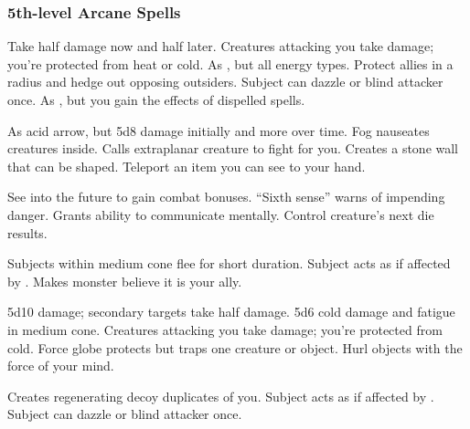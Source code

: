 \subsubsection{5th-level Arcane Spells} 
\begin{swspelllist}
     Take half damage now and half later. 
     Creatures attacking you take damage; you're protected from heat or cold.   As , but all energy types.
     Protect allies in a \areamed radius and hedge out opposing outsiders.
     Subject can dazzle or blind attacker once.
     As , but you gain the effects of dispelled spells.

     As acid arrow, but 5d8 damage initially and more over time.
     Fog nauseates creatures inside.
     Calls extraplanar creature to fight for you.
     Creates a stone wall that can be shaped.
     Teleport an item you can see to your hand.

     See into the future to gain combat bonuses.
     ``Sixth sense'' warns of impending danger.
     Grants ability to communicate mentally. 
     Control creature's next die results.

     Subjects within medium cone flee for short duration.
    \spellhead{}
     Subject acts as if affected by .
     Makes monster believe it is your ally.

     5d10 damage; secondary targets take half damage.
     5d6 cold damage and fatigue in medium cone.
     Creatures attacking you take damage; you're protected from cold.
     Force globe protects but traps one creature or object.
     Hurl objects with the force of your mind.

     Creates regenerating decoy duplicates of you.
     Subject acts as if affected by .
     Subject can dazzle or blind attacker once.
    \spellheadrestricted{}


\end{swspelllist}
